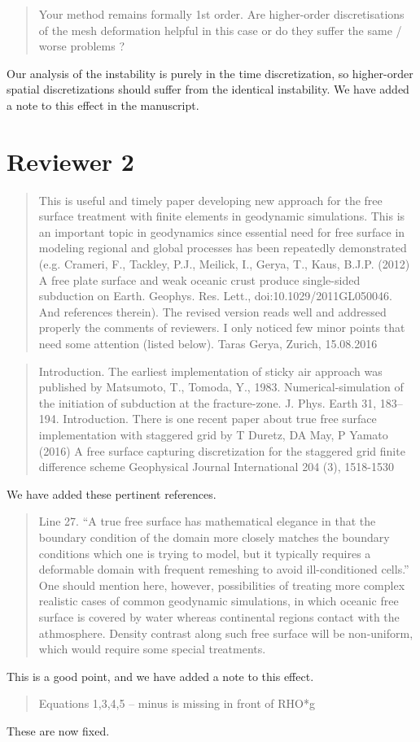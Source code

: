 \documentclass[a4paper,12pt]{article}
\begin{document}
\begin{quotation}
   Your method remains formally 1st order. Are higher-order discretisations of the mesh deformation helpful in this case or do they suffer the same / worse problems ?
\end{quotation}

Our analysis of the instability is purely in the time discretization, 
so higher-order spatial discretizations should suffer from the identical instability.
We have added a note to this effect in the manuscript.

\section*{Reviewer 2}
\begin{quotation}
This is useful and timely paper developing new approach for the free surface treatment with finite elements in geodynamic simulations. This is an important topic in geodynamics since essential need for free surface in modeling regional and global processes has been repeatedly demonstrated (e.g. Crameri, F., Tackley, P.J., Meilick, I., Gerya, T., Kaus, B.J.P. (2012) A free plate surface and weak oceanic crust produce single-sided subduction on Earth. Geophys. Res. Lett., doi:10.1029/2011GL050046. And references therein). The revised version reads well and addressed properly the comments of reviewers. I only noticed few minor points that need some attention (listed below).
Taras Gerya, Zurich, 15.08.2016
\end{quotation}

\begin{quotation}
Introduction. The earliest implementation of sticky air approach was published by Matsumoto, T., Tomoda, Y., 1983. Numerical-simulation of the initiation of subduction at the fracture-zone. J. Phys. Earth 31, 183–194.
Introduction. There is one recent paper about true free surface implementation with staggered grid by T Duretz, DA May, P Yamato  (2016) A free surface capturing discretization for the staggered grid finite difference scheme Geophysical Journal International 204 (3), 1518-1530 
\end{quotation}
We have added these pertinent references.

\begin{quotation}
Line 27. “A true free surface has mathematical elegance in that the boundary condition of the domain more closely matches the boundary conditions which one is trying to model, but it typically requires a deformable domain with frequent remeshing to avoid ill-conditioned cells.” One should mention here, however, possibilities of treating more complex realistic cases of common geodynamic simulations, in which oceanic free surface is covered by water whereas continental regions contact with the athmosphere. Density contrast along such free surface will be non-uniform, which would require some special treatments.
\end{quotation}
This is a good point, and we have added a note to this effect.
\begin{quotation}
Equations 1,3,4,5 – minus is missing in front of RHO*g
\end{quotation}
These are now fixed.
\end{document}
